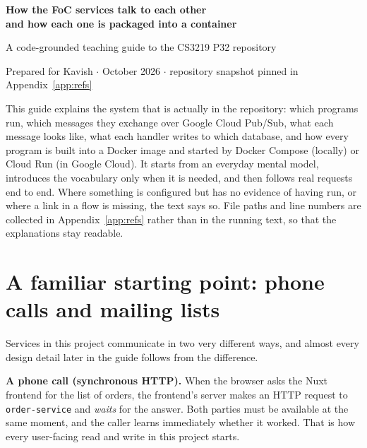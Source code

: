 \documentclass[11pt,a4paper]{article}
\newcommand{\code}[1]{\nolinkurl{#1}}
\begin{document}
\thispagestyle{plain}
\begin{center}
{\LARGE\bfseries\color{accent} How the FoC services talk to each other\\[2pt]
and how each one is packaged into a container\par}
\vspace{6pt}
{\large A code-grounded teaching guide to the CS3219 P32 repository\par}
\vspace{4pt}
{\normalsize Prepared for Kavish \quad$\cdot$ October 2026 \quad$\cdot$\quad
repository snapshot pinned in Appendix~\ref{app:refs}\par}
\end{center}
\vspace{4pt}

\noindent This guide explains the system that is actually in the repository: which
programs run, which messages they exchange over Google Cloud Pub/Sub, what each message
looks like, what each handler writes to which database, and how every program is built
into a Docker image and started by Docker Compose (locally) or Cloud Run (in Google
Cloud). It starts from an everyday mental model, introduces the vocabulary only when it
is needed, and then follows real requests end to end. Where something is configured but
has no evidence of having run, or where a link in a flow is missing, the text says so.
File paths and line numbers are collected in Appendix~\ref{app:refs} rather than in the
running text, so that the explanations stay readable.

{\small\setlength{\parskip}{1pt}\tableofcontents}

\section{A familiar starting point: phone calls and mailing lists}
\label{sec:mental}

Services in this project communicate in two very different ways, and almost every
design detail later in the guide follows from the difference.

\textbf{A phone call (synchronous HTTP).} When the browser asks the Nuxt frontend for
the list of orders, the frontend's server makes an HTTP request to
\code{order-service} and \emph{waits} for the answer. Both parties must be available at
the same moment, and the caller learns immediately whether it worked. That is how every
user-facing read and write in this project starts.
\end{document}
